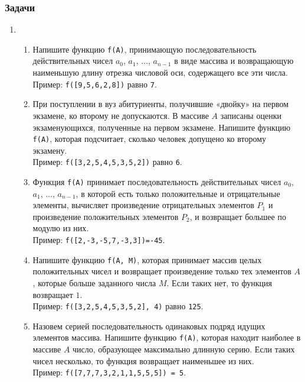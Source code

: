 \documentclass{article}
\begin{document}
\subsubsection*{Задачи}
\begin{enumerate}[label={}, leftmargin=0pt, itemindent=0pt]
\item


\begin{enumerate}[label=\arabic{enumi}.\arabic*.]
\item 
Напишите функцию \texttt{f(A)}, принимающую последовательность действительных чисел $a_0$, $a_1$, $\ldots$, $a_{n-1}$ в виде массива и возвращающую наименьшую длину отрезка числовой оси, содержащего все эти числа.
\\Пример: \texttt{f([9,5,6,2,8])} равно \texttt{7}.

\item 
При поступлении в вуз абитуриенты, получившие «двойку» на первом экзамене, ко второму не допускаются. В массиве $A$ записаны оценки экзаменующихся, полученные на первом экзамене. Напишите функцию \texttt{f(A)}, которая подсчитает, сколько человек допущено ко второму экзамену.
\\Пример: \texttt{f([3,2,5,4,5,3,5,2])} равно \texttt{6}.

\item 
Функция \texttt{f(A)} принимает последовательность действительных чисел $a_0$, $a_1$, $\ldots$, $a_{n-1}$, в которой есть только положительные и отрицательные элементы, вычисляет произведение отрицательных элементов $P_1$ и произведение положительных элементов $P_2$, и возвращает большее по модулю из них.
\\Пример: \texttt{f([2,-3,-5,7,-3,3])=-45}. 

\item 
Напишите функцию \texttt{f(A, M)}, которая принимает массив целых положительных чисел и возвращает произведение только тех элементов $A$, которые больше заданного числа $M$. Если таких нет, то функция возвращает $1$.
\\Пример: \texttt{f([3,2,5,4,5,3,5,2],\,4)} равно \texttt{125}.

\item 
Назовем серией последовательность одинаковых подряд идущих элементов массива. 
Напишите функцию \texttt{f(A)}, которая находит наиболее в массиве $A$ число, образующее максимально длинную серию. Если таких чисел несколько, то функция возвращает наименьшее из них.
\\Пример: \texttt{f([7,7,7,3,2,1,1,5,5,5]) = 5}.


\end{enumerate}
\end{enumerate}
\end{document}
